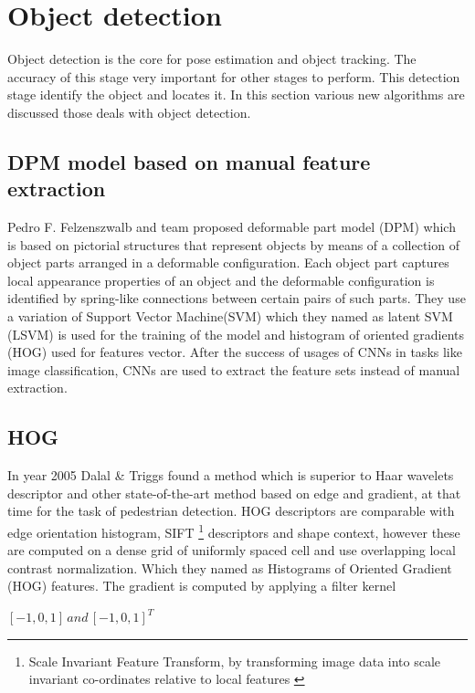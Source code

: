\section{Object detection}
Object detection is the core for pose estimation and object tracking. The accuracy of this stage very important for other stages to perform. This detection stage identify the object and locates it. In this section various new algorithms are discussed those deals with object detection.
\subsection{DPM model based on manual feature extraction}
Pedro F. Felzenszwalb and team proposed deformable part model (DPM) \cite{felzenszwalb2009object} which is based on pictorial structures that represent objects by means of a collection of object parts arranged in a deformable configuration. Each object part captures local appearance properties of
an object and the deformable configuration is identified by spring-like connections between certain pairs of such parts. They use a variation of Support Vector Machine(SVM) which they named as latent SVM (LSVM) is used for the training of the model and  histogram of oriented gradients (HOG) used for features vector. After the success of usages of CNNs in tasks like image classification, CNNs are used to extract the feature sets instead of manual extraction.

\subsection{HOG }
In year 2005 Dalal \& Triggs found a method which is superior to Haar wavelets descriptor and other state-of-the-art method based on edge and gradient, at that time for the task of pedestrian detection. HOG descriptors are comparable with edge orientation histogram, SIFT \footnote{Scale Invariant Feature Transform, by transforming image data into scale invariant co-ordinates relative to local features \cite{lowe2004distinctive}} descriptors and shape context, however these are computed on a dense grid of uniformly spaced cell and use overlapping local contrast normalization. Which they named as Histograms of Oriented Gradient (HOG) features\cite{dalal2005histograms}. The gradient is computed by applying a filter kernel \\
\begin{center}
$[-1,0,1] \, and \, [-1,0,1] ^{T}$
\end{center}

